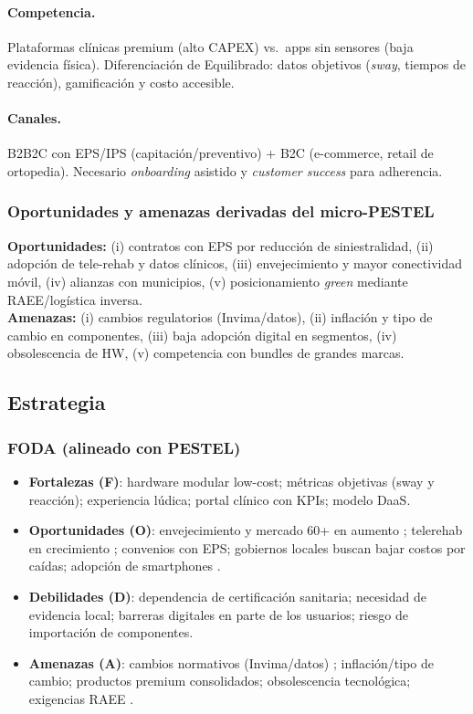 \paragraph{Competencia.}
Plataformas clínicas premium (alto CAPEX) vs.\ apps sin sensores (baja evidencia física). Diferenciación de Equilibrado: datos objetivos (\emph{sway}, tiempos de reacción), gamificación y costo accesible.

\paragraph{Canales.}
B2B2C con EPS/IPS (capitación/preventivo) + B2C (e-commerce, retail de ortopedia). Necesario \emph{onboarding} asistido y \emph{customer success} para adherencia.

\subsubsection*{Oportunidades y amenazas derivadas del micro-PESTEL}
\textbf{Oportunidades:} (i) contratos con EPS por reducción de siniestralidad, (ii) adopción de tele-rehab y datos clínicos, (iii) envejecimiento y mayor conectividad móvil, (iv) alianzas con municipios, (v) posicionamiento \emph{green} mediante RAEE/logística inversa.\\
\textbf{Amenazas:} (i) cambios regulatorios (Invima/datos), (ii) inflación y tipo de cambio en componentes, (iii) baja adopción digital en segmentos, (iv) obsolescencia de HW, (v) competencia con bundles de grandes marcas.

\subsection{Estrategia}

\subsubsection{FODA (alineado con PESTEL)}
\begin{itemize}
    \item \textbf{Fortalezas (F)}: hardware modular low-cost; métricas objetivas (sway y reacción); experiencia lúdica; portal clínico con KPIs; modelo DaaS.
    \item \textbf{Oportunidades (O)}: envejecimiento y mercado 60+ en aumento \cite{MinsaludMayores2024,DANEProyecciones2042}; telerehab en crecimiento \cite{GrandViewTelerehab}; convenios con EPS; gobiernos locales buscan bajar costos por caídas; adopción de smartphones \cite{GSMA2024MobileLatAm}.
    \item \textbf{Debilidades (D)}: dependencia de certificación sanitaria; necesidad de evidencia local; barreras digitales en parte de los usuarios; riesgo de importación de componentes.
    \item \textbf{Amenazas (A)}: cambios normativos (Invima/datos) \cite{InvimaDispositivos,Decreto4725,Ley1581Datos}; inflación/tipo de cambio; productos premium consolidados; obsolescencia tecnológica; exigencias RAEE \cite{Ley1672RAEE,Resolucion1512RAEE}.
\end{itemize}

